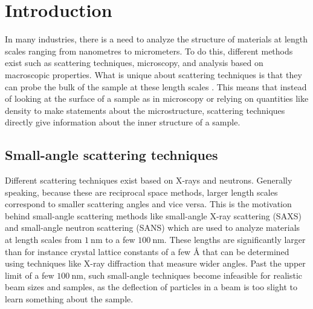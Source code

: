 \chapter{Introduction}
\label{chapter:introduction}
\label{c1:introduction}
In many industries, there is a need to analyze the structure of materials at length scales ranging from nanometres to micrometers. To do this, different methods exist such as scattering techniques, microscopy, and analysis based on macroscopic properties. What is unique about scattering techniques is that they can probe the bulk of the sample at these length scales \cite{bouwman2021}. This means that instead of looking at the surface of a sample as in microscopy or relying on quantities like density to make statements about the microstructure, scattering techniques directly give information about the inner structure of a sample. 

\section{Small-angle scattering techniques}
\label{c1.1}
Different scattering techniques exist based on X-rays and neutrons. Generally speaking, because these are reciprocal space methods, larger length scales correspond to smaller scattering angles and vice versa. This is the motivation behind small-angle scattering methods like small-angle X-ray scattering (SAXS) and small-angle neutron scattering (SANS) which are used to analyze materials at length scales from $\SI{1}{\nano\meter}$ to a few $\SI{100}{\nano\meter}$. These lengths are significantly larger than for instance crystal lattice constants of a few $\unit{\angstrom}$ that can be determined using techniques like X-ray diffraction that measure wider angles. Past the upper limit of a few $\SI{100}{\nano\meter}$, such small-angle techniques become infeasible for realistic beam sizes and samples, as the deflection of particles in a beam is too slight to learn something about the sample.

